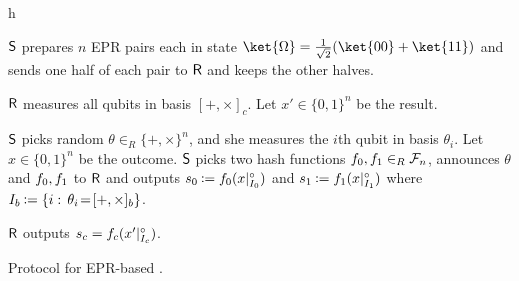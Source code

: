 \begin{myfigure}{h}
\begin{myprotocol}{\eprRandlqot}
\item $\S$ prepares $n$ EPR pairs each in state 
      $\ket{\Omega}=\frac{1}{\sqrt{2}}(\ket{00}+\ket{11})$ 
and sends one half of each pair to $\R$ and keeps the other
  halves.
\item $\R$ measures all qubits in basis $[+,\times]_{c}$. Let $x' \in
  \{0,1\}^n$ be the result. 
\item $\S$ picks random $\theta \in_R \{+,\times \}^n$, and she
  measures the $i$th qubit in basis $\theta_i$. Let $x\in\{0,1\}^n$ be
  the outcome. $\S$ picks two hash functions $\hf_0, \hf_1 \in_R \chf{n}$,
  announces $\theta$ and $\hf_0, \hf_1$ to $\R$ and outputs $s_0
  \assign \hf_0(x \pad_{I_0})$ and $s_1 \assign \hf_1(x \pad_{I_1})$ where
  $I_b \assign \Set{i}{\theta_i \!=\! [+,\times]_b}$. \label{step:afterbound}
\item $\R$ outputs $s_{c} = \hf_{c}(x' \pad_{I_{c}})$.
\end{myprotocol}
\caption{Protocol for EPR-based \boldmath\RandlStringOT.}\label{fig:eprRandlqot}
\end{myfigure}



